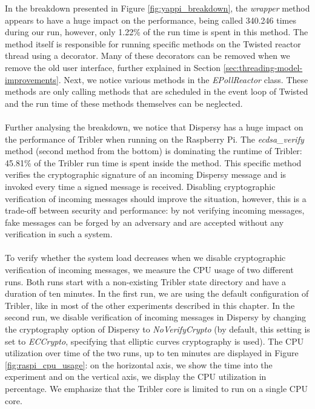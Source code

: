 \noindent In the breakdown presented in Figure \ref{fig:yappi_breakdown}, the \emph{wrapper} method appears to have a huge impact on the performance, being called 340.246 times during our run, however, only 1.22\% of the run time is spent in this method. The method itself is responsible for running specific methods on the Twisted reactor thread using a decorator. Many of these decorators can be removed when we remove the old user interface, further explained in Section \ref{sec:threading-model-improvements}. Next, we notice various methods in the \emph{EPollReactor} class. These methods are only calling methods that are scheduled in the event loop of Twisted and the run time of these methods themselves can be neglected.\\\\
Further analysing the breakdown, we notice that Dispersy has a huge impact on the performance of Tribler when running on the Raspberry Pi. The \emph{ecdsa\_verify} method (second method from the bottom) is dominating the runtime of Tribler: 45.81\% of the Tribler run time is spent inside the method. This specific method verifies the cryptographic signature of an incoming Dispersy message and is invoked every time a signed message is received. Disabling cryptographic verification of incoming messages should improve the situation, however, this is a trade-off between security and performance: by not verifying incoming messages, fake messages can be forged by an adversary and are accepted without any verification in such a system.\\\\
To verify whether the system load decreases when we disable cryptographic verification of incoming messages, we measure the CPU usage of two different runs. Both runs start with a non-existing Tribler state directory and have a duration of ten minutes. In the first run, we are using the default configuration of Tribler, like in most of the other experiments described in this chapter. In the second run, we disable verification of incoming messages in Dispersy by changing the cryptography option of Dispersy to \emph{NoVerifyCrypto} (by default, this setting is set to \emph{ECCrypto}, specifying that elliptic curves cryptography is used). The CPU utilization over time of the two runs, up to ten minutes are displayed in Figure \ref{fig:raspi_cpu_usage}: on the horizontal axis, we show the time into the experiment and on the vertical axis, we display the CPU utilization in percentage. We emphasize that the Tribler core is limited to run on a single CPU core.\\

